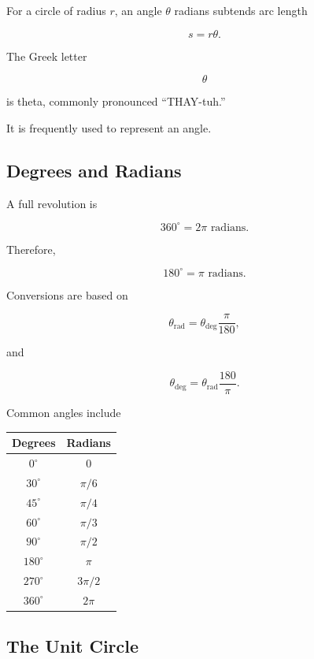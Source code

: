 For a circle of radius \(r\), an angle \(\theta\) radians subtends arc length

\[ s=r\theta. \]

The Greek letter

\[ \theta \]

is theta, commonly pronounced ``THAY-tuh.''

It is frequently used to represent an angle.

\subsection{Degrees and Radians}
\label{subsec:degree-radian-conversion}

A full revolution is

\[ 360^\circ=2\pi\text{ radians}. \]

Therefore,

\[ 180^\circ=\pi\text{ radians}. \]

Conversions are based on

\[ \theta_{\mathrm{rad}}
=\theta_{\mathrm{deg}}\frac{\pi}{180}, \]

and

\[ \theta_{\mathrm{deg}}
=\theta_{\mathrm{rad}}\frac{180}{\pi}. \]

Common angles include

\begin{center}
\begin{tabular}{cc}
\toprule
Degrees & Radians\\
\midrule
\(0^\circ\) & \(0\)\\
\(30^\circ\) & \(\pi/6\)\\
\(45^\circ\) & \(\pi/4\)\\
\(60^\circ\) & \(\pi/3\)\\
\(90^\circ\) & \(\pi/2\)\\
\(180^\circ\) & \(\pi\)\\
\(270^\circ\) & \(3\pi/2\)\\
\(360^\circ\) & \(2\pi\)\\
\bottomrule
\end{tabular}
\end{center}

\subsection{The Unit Circle}
\label{subsec:unit-circle-analysis}

